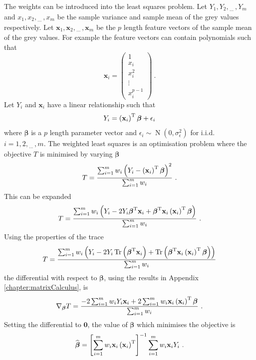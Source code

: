 \documentclass[12pt]{report}
\DeclareMathOperator{\trace}{Tr}
\DeclareMathOperator{\normal}{N}
\newcommand{\T}{^\textup{T}}
\newcommand{\dotdotdot}{_{\phantom{.}\cdots}}
\newcommand{\vect}[1]{\mathbf{#1}}
\newcommand{\vectGreek}[1]{\boldsymbol{#1}}
\begin{document}
The weights can be introduced into the least squares problem. Let $Y_1,Y_2,\dotdotdot,Y_m$ and $x_1,x_2,\dotdotdot,x_m$ be the sample variance and sample mean of the grey values respectively. Let $\vect{x}_1,\vect{x}_2,\dotdotdot,\vect{x}_m$ be the $p$ length feature vectors of the sample mean of the grey values. For example the feature vectors can contain polynomials such that
\begin{equation}
\vect{x}_i=
\begin{pmatrix}
	1\\x_i\\x_i^2\\\vdots\\x_i^{p-1}
\end{pmatrix} \ .
\end{equation}
Let $Y_i$ and $\vect{x}_i$ have a linear relationship such that
\begin{equation}
Y_i = \left(\vect{x}_i\right)\T\vectGreek{\beta} + \epsilon_i
\end{equation}
where $\vectGreek{\beta}$ is a $p$ length parameter vector and $\epsilon_i\sim\normal(0,\sigma_{\epsilon}^2)$ for i.i.d.~$i=1,2,\dotdotdot,m$. The weighted least squares is an optimisation problem where the objective $T$ is minimised by varying $\vectGreek{\beta}$
\begin{equation}
T =
\frac{\sum_{i=1}^mw_i\left(Y_i-\left(\vect{x}_i\right)\T\vectGreek{\beta}\right)^2}
{\sum_{i=1}^mw_i} \ .
\end{equation}
This can be expanded
\begin{equation*}
T =
\frac{\sum_{i=1}^mw_i\left(Y_i-2Y_i\vectGreek{\beta}\T\vect{x}_i+\vectGreek{\beta}\T\vect{x}_i\left(\vect{x}_i\right)\T\vectGreek{\beta}\right)}
{\sum_{i=1}^mw_i} \ .
\end{equation*}
Using the properties of the trace
\begin{equation*}
T =
\frac{\sum_{i=1}^mw_i\left(Y_i-2Y_i\trace\left(\vectGreek{\beta}\T\vect{x}_i\right)+\trace\left(\vectGreek{\beta}\T\vect{x}_i\left(\vect{x}_i\right)\T\vectGreek{\beta}\right)\right)}
{\sum_{i=1}^mw_i}
\end{equation*}
the differential with respect to $\vectGreek{\beta}$, using the results in Appendix \ref{chapter:matrixCalculus}, is
\begin{equation}
\nabla_{\vectGreek{\beta}}T = \frac{-2\sum_{i=1}^mw_iY_i\vect{x}_i+2\sum_{i=1}^mw_i\vect{x}_i\left(\vect{x}_i\right)\T\vectGreek{\beta}}{\sum_{i=1}^mw_i} \ .
\end{equation}
Setting the differential to $\vect{0}$, the value of $\vectGreek{\beta}$ which minimises the objective is 
\begin{equation}
\widehat{\vectGreek{\beta}}=\left[\sum_{i=1}^mw_i\vect{x}_i\left(\vect{x}_i\right)\T\right]^{-1}\sum_{i=1}^mw_i\vect{x}_iY_i \ .
\end{equation}
\end{document}
